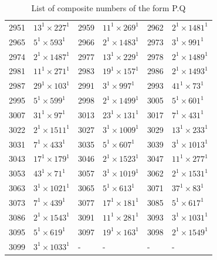 \documentclass[11pt,a4paper]{article}
\begin{document}
\begin{enumerate}[1.]
\begin{flushleft}
\begin{table}[H]
\begin{adjustbox}{scale=0.9,center}
\begin{tabular}{ ||p{2cm}|p{2cm}||p{2cm}|p{2cm}||p{2cm}|p{2cm}|| }
				2951 & $13^1 \times 227^1$&2959 & $11^1 \times 269^1$&2962 & $2^1 \times 1481^1$\\
				2965 & $5^1 \times 593^1$&2966 & $2^1 \times 1483^1$&2973 & $3^1 \times 991^1$\\
				2974 & $2^1 \times 1487^1$&2977 & $13^1 \times 229^1$&2978 & $2^1 \times 1489^1$\\
				2981 & $11^1 \times 271^1$&2983 & $19^1 \times 157^1$&2986 & $2^1 \times 1493^1$\\
				2987 & $29^1 \times 103^1$&2991 & $3^1 \times 997^1$&2993 & $41^1 \times 73^1$\\
				2995 & $5^1 \times 599^1$&2998 & $2^1 \times 1499^1$&3005 & $5^1 \times 601^1$\\
				3007 & $31^1 \times 97^1$&3013 & $23^1 \times 131^1$&3017 & $7^1 \times 431^1$\\
				3022 & $2^1 \times 1511^1$&3027 & $3^1 \times 1009^1$&3029 & $13^1 \times 233^1$\\
				3031 & $7^1 \times 433^1$&3035 & $5^1 \times 607^1$&3039 & $3^1 \times 1013^1$\\
				3043 & $17^1 \times 179^1$&3046 & $2^1 \times 1523^1$&3047 & $11^1 \times 277^1$\\
				3053 & $43^1 \times 71^1$&3057 & $3^1 \times 1019^1$&3062 & $2^1 \times 1531^1$\\
				3063 & $3^1 \times 1021^1$&3065 & $5^1 \times 613^1$&3071 & $37^1 \times 83^1$\\
				3073 & $7^1 \times 439^1$ & 3077 & $17^1 \times 181^1$&3085 & $5^1 \times 617^1$\\
				3086 & $2^1 \times 1543^1$ & 3091 & $11^1 \times 281^1$&3093 & $3^1 \times 1031^1$\\
				3095 & $5^1 \times 619^1$ & 3097 & $19^1 \times 163^1$&3098 & $2^1 \times 1549^1$\\
				3099 & $3^1 \times 1033^1$& - & - & - & -\\
				\hline
			\end{tabular}
		\end{adjustbox}
			\caption{List of composite numbers of the form P.Q}
			\label{table:composite-pq}
		
		
			\end{table}
		

\end{flushleft}
\end{enumerate}
\end{document}
